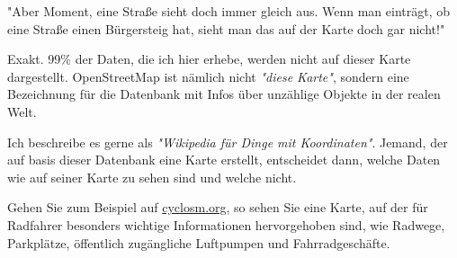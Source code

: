 \documentclass[10pt,foldmark,notumble]{leaflet}
\newcommand{\myhy}[1]{{\color{blue}\setulcolor{blue}\ul{#1}}}
\begin{document}
    \hspace{15pt} "Aber Moment, eine Straße sieht doch immer gleich aus.
    Wenn man einträgt, ob eine Straße einen Bürgersteig hat, sieht man das auf der Karte doch gar nicht!"

    Exakt. 99\% der Daten, die ich hier erhebe, werden nicht auf dieser Karte dargestellt.
    OpenStreetMap ist nämlich nicht \textit{"diese Karte"}, sondern eine Bezeichnung für die Datenbank mit Infos über unzählige Objekte in der realen Welt.

    Ich beschreibe es gerne als \textit{"Wikipedia für Dinge mit Koordinaten"}.
    Jemand, der auf basis dieser Datenbank eine Karte erstellt, entscheidet dann, welche Daten wie auf seiner Karte zu sehen sind und welche nicht.

    Gehen Sie zum Beispiel auf \myhy{cyclosm.org}, so sehen Sie eine Karte, auf der für Radfahrer besonders wichtige Informationen hervorgehoben sind, wie Radwege, Parkplätze, öffentlich zugängliche Luftpumpen und Fahrradgeschäfte.
\end{document}
